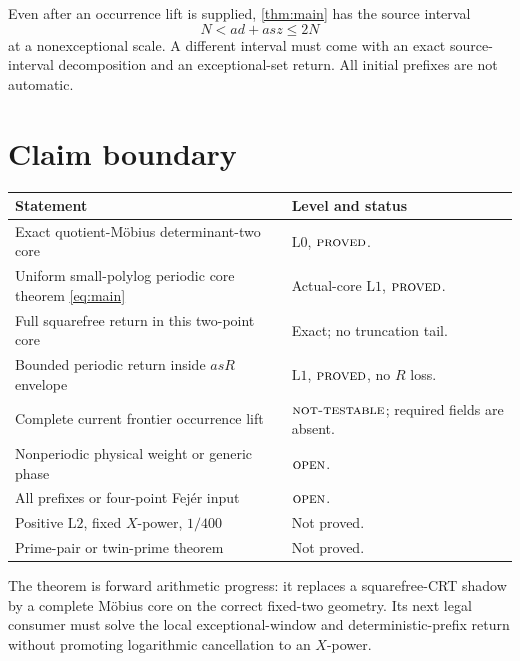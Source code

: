 \documentclass[11pt]{article}
\theoremstyle{definition}
\theoremstyle{remark}
\newcommand{\Lzero}{\mathrm{L0}}
\newcommand{\Lone}{\mathrm{L1}}
\newcommand{\Ltwo}{\mathrm{L2}}
\newcommand{\NT}{\textnormal{\textsc{not-testable}}}
\newcommand{\PROVED}{\textnormal{\textsc{proved}}}
\newcommand{\OPEN}{\textnormal{\textsc{open}}}
\begin{document}
Even after an occurrence lift is supplied, \cref{thm:main} has the
source interval
\[
 N<ad+asz\le2N
\]
at a nonexceptional scale.  A different interval must come with an
exact source-interval decomposition and an exceptional-set return.
All initial prefixes are not automatic.

\section{Claim boundary}

\begin{center}
\small
\begin{tabularx}{\textwidth}{@{}p{}Y@{}}
\toprule
Statement & Level and status\\
\midrule
Exact quotient-M\"obius determinant-two core &
\(\Lzero\), \(\PROVED\).\\
Uniform small-polylog periodic core theorem
\eqref{eq:main} &
Actual-core \(\Lone\), \(\PROVED\).\\
Full squarefree return in this two-point core &
Exact; no truncation tail.\\
Bounded periodic return inside \(asR\) envelope &
\(\Lone\), \(\PROVED\), no \(R\) loss.\\
Complete current frontier occurrence lift &
\(\NT\); required fields are absent.\\
Nonperiodic physical weight or generic phase &
\(\OPEN\).\\
All prefixes or four-point Fej\'er input &
\(\OPEN\).\\
Positive \(\Ltwo\), fixed \(X\)-power, \(1/400\) &
Not proved.\\
Prime-pair or twin-prime theorem & Not proved.\\
\bottomrule
\end{tabularx}
\end{center}

The theorem is forward arithmetic progress: it replaces a
squarefree-CRT shadow by a complete M\"obius core on the correct
fixed-two geometry.  Its next legal consumer must solve the local
exceptional-window and deterministic-prefix return without
promoting logarithmic cancellation to an \(X\)-power.

\begingroup
\footnotesize
\raggedright


\endgroup
\end{document}
